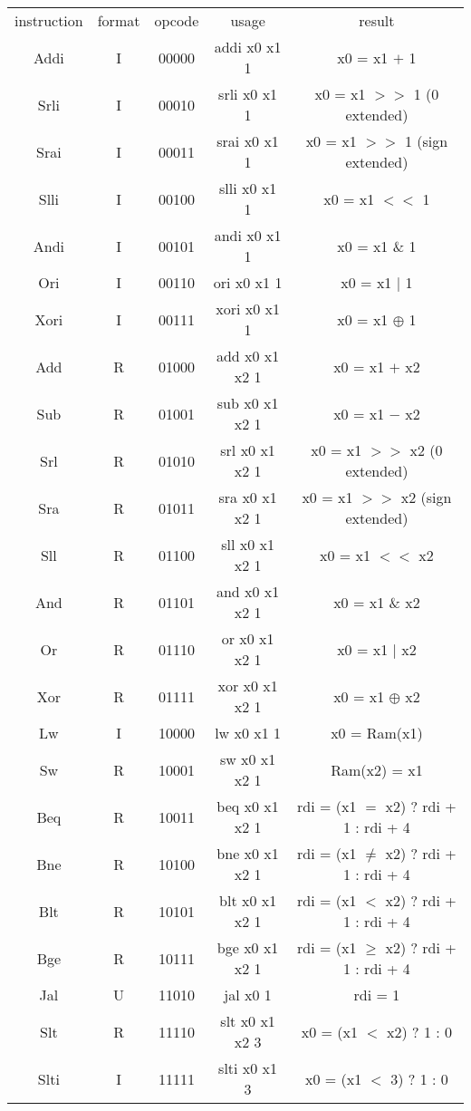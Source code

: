 \documentclass{article}
\begin{document}
\begin{center}
	\def\arraystretch{2.2}
	\begin{tabular}{c|c|c|c|c}
		instruction & format & opcode & usage & result\\
		\cline{1-5}
		Addi & I & 00000 & addi x0 x1 1 & x0 = x1 $+$ 1 \\
		Srli & I & 00010 & srli x0 x1 1 & x0 = x1 $>>$ 1 (0 extended)\\
		Srai & I & 00011 & srai x0 x1 1 & x0 = x1 $>>$ 1 (sign extended)\\
		Slli & I & 00100 & slli x0 x1 1 & x0 = x1 $<<$ 1 \\
		Andi & I & 00101 & andi x0 x1 1 & x0 = x1 \& 1 \\
		Ori & I & 00110 & ori x0 x1 1 & x0 = x1 $|$ 1 \\
		Xori & I & 00111 & xori x0 x1 1 & x0 = x1 $\oplus$ 1 \\
		Add & R & 01000 & add x0 x1 x2 1& x0 = x1 $+$ x2 \\
		Sub & R & 01001 & sub x0 x1 x2 1& x0 = x1 $-$ x2 \\
		Srl & R & 01010 & srl x0 x1 x2 1& x0 = x1 $>>$ x2 (0 extended)\\
		Sra & R & 01011 & sra x0 x1 x2 1& x0 = x1 $>>$ x2 (sign extended)\\
		Sll & R & 01100 & sll x0 x1 x2 1& x0 = x1 $<<$ x2 \\
		And & R & 01101 & and x0 x1 x2 1& x0 = x1 \& x2 \\
		Or & R & 01110 & or x0 x1 x2 1& x0 = x1 $|$ x2 \\
		Xor & R & 01111 & xor x0 x1 x2 1& x0 = x1 $\oplus$ x2 \\
		Lw & I & 10000 & lw x0 x1 1 & x0 = Ram(x1)\\
		Sw & R & 10001 & sw x0 x1 x2 1& Ram(x2) = x1\\
		Beq & R & 10011 & beq x0 x1 x2 1& rdi = (x1 $=$ x2) ? rdi + 1 : rdi + 4\\
		Bne & R & 10100 & bne x0 x1 x2 1& rdi = (x1 $\neq$ x2) ? rdi + 1 : rdi + 4\\
		Blt & R & 10101 & blt x0 x1 x2 1& rdi = (x1 $<$ x2) ? rdi + 1 : rdi + 4\\
		Bge & R & 10111 & bge x0 x1 x2 1& rdi = (x1 $\geq$ x2) ? rdi + 1 : rdi + 4\\
		Jal & U & 11010 & jal x0 1 & rdi = 1\\
		Slt & R & 11110 & slt x0 x1 x2 3 & x0 = (x1 $<$ x2) ? 1 : 0 \\
		Slti & I & 11111 & slti x0 x1 3 & x0 = (x1 $<$ 3) ? 1 : 0 \\
	\end{tabular}
\end{center} 
\end{document}
